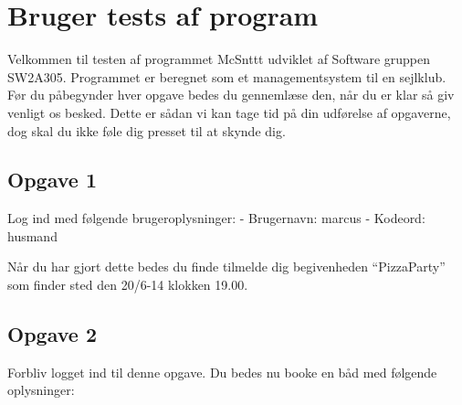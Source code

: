 \chapter{Bruger tests af program}\label{BrugerTestCases}





Velkommen til testen af programmet McSnttt udviklet af Software gruppen SW2A305.
Programmet er beregnet som et managementsystem til en sejlklub.
Før du påbegynder hver opgave bedes du gennemlæse den, når du er klar så giv venligt os besked.
Dette er sådan vi kan tage tid på din udførelse af opgaverne, dog skal du ikke føle dig presset til at skynde dig.

\section{Opgave 1}

Log ind med følgende brugeroplysninger: 
\newline - Brugernavn: marcus
\newline - Kodeord: husmand

Når du har gjort dette bedes du finde tilmelde dig begivenheden ``PizzaParty'' som finder sted den 20/6-14  klokken 19.00.

\section{Opgave 2}

Forbliv logget ind til denne opgave. Du bedes nu booke en båd med følgende oplysninger:

